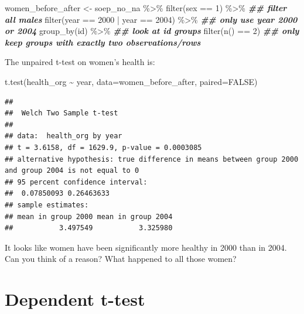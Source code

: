\documentclass[
]{book}
\newenvironment{Shaded}{\begin{snugshade}}{\end{snugshade}}
\newcommand{\AttributeTok}[1]{\textcolor[rgb]{0.77,0.63,0.00}{#1}}
\newcommand{\ConstantTok}[1]{\textcolor[rgb]{0.00,0.00,0.00}{#1}}
\newcommand{\DecValTok}[1]{\textcolor[rgb]{0.00,0.00,0.81}{#1}}
\newcommand{\DocumentationTok}[1]{\textcolor[rgb]{0.56,0.35,0.01}{\textbf{\textit{#1}}}}
\newcommand{\FunctionTok}[1]{\textcolor[rgb]{0.00,0.00,0.00}{#1}}
\newcommand{\NormalTok}[1]{#1}
\newcommand{\OtherTok}[1]{\textcolor[rgb]{0.56,0.35,0.01}{#1}}
\newcommand{\SpecialCharTok}[1]{\textcolor[rgb]{0.00,0.00,0.00}{#1}}
\begin{document}
\begin{Shaded}
\begin{Highlighting}[]
\NormalTok{women\_before\_after }\OtherTok{\textless{}{-}}\NormalTok{ soep\_no\_na }\SpecialCharTok{\%\textgreater{}\%}
  \FunctionTok{filter}\NormalTok{(sex }\SpecialCharTok{==} \DecValTok{1}\NormalTok{) }\SpecialCharTok{\%\textgreater{}\%} \DocumentationTok{\#\# filter all males}
  \FunctionTok{filter}\NormalTok{(year }\SpecialCharTok{==} \DecValTok{2000} \SpecialCharTok{|}\NormalTok{ year }\SpecialCharTok{==} \DecValTok{2004}\NormalTok{) }\SpecialCharTok{\%\textgreater{}\%} \DocumentationTok{\#\# only use year 2000 or 2004}
  \FunctionTok{group\_by}\NormalTok{(id) }\SpecialCharTok{\%\textgreater{}\%} \DocumentationTok{\#\# look at id groups}
  \FunctionTok{filter}\NormalTok{(}\FunctionTok{n}\NormalTok{() }\SpecialCharTok{==} \DecValTok{2}\NormalTok{) }\DocumentationTok{\#\# only keep groups with exactly two observations/rows}
\end{Highlighting}
\end{Shaded}

The unpaired t-test on women's health is:

\begin{Shaded}
\begin{Highlighting}[]
\FunctionTok{t.test}\NormalTok{(health\_org }\SpecialCharTok{\textasciitilde{}}\NormalTok{ year, }\AttributeTok{data=}\NormalTok{women\_before\_after, }\AttributeTok{paired=}\ConstantTok{FALSE}\NormalTok{)}
\end{Highlighting}
\end{Shaded}

\begin{verbatim}
## 
##  Welch Two Sample t-test
## 
## data:  health_org by year
## t = 3.6158, df = 1629.9, p-value = 0.0003085
## alternative hypothesis: true difference in means between group 2000 and group 2004 is not equal to 0
## 95 percent confidence interval:
##  0.07850093 0.26463633
## sample estimates:
## mean in group 2000 mean in group 2004 
##           3.497549           3.325980
\end{verbatim}

It looks like women have been significantly more healthy in 2000 than in 2004. Can you think of a reason? What happened to all those women?

\hypertarget{dependent-t-test}{%
\section{Dependent t-test}\label{dependent-t-test}}
\end{document}
